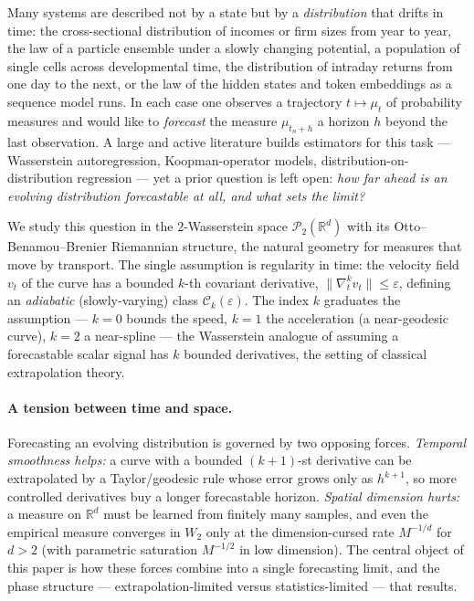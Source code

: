 \documentclass[11pt]{article}
\theoremstyle{definition}
\theoremstyle{remark}
\newcommand{\R}{\mathbb{R}}
\newcommand{\PP}{\mathcal{P}_2(\R^d)}
\newcommand{\Ck}{\mathcal{C}_k(\varepsilon)}
\begin{document}
Many systems are described not by a state but by a \emph{distribution} that drifts in time: the
cross-sectional distribution of incomes or firm sizes from year to year, the law of a particle
ensemble under a slowly changing potential, a population of single cells across developmental
time, the distribution of intraday returns from one day to the next, or the law of the hidden
states and token embeddings as a sequence model runs. In each case one observes a trajectory
$t\mapsto\mu_t$ of probability measures and would like to \emph{forecast} the measure
$\mu_{t_n+h}$ a horizon $h$ beyond the last observation. A large and active literature builds
estimators for this task --- Wasserstein autoregression, Koopman-operator models,
distribution-on-distribution regression --- yet a prior question is left open: \emph{how far
ahead is an evolving distribution forecastable at all, and what sets the limit?}

We study this question in the $2$-Wasserstein space $\PP$ with its Otto--Benamou--Brenier
Riemannian structure, the natural geometry for measures that move by transport. The single
assumption is regularity in time: the velocity field $v_t$ of the curve has a bounded $k$-th
covariant derivative, $\|\nabla_t^k v_t\|\le\varepsilon$, defining an \emph{adiabatic}
(slowly-varying) class $\Ck$. The index $k$ graduates the assumption --- $k=0$ bounds the speed,
$k=1$ the acceleration (a near-geodesic curve), $k=2$ a near-spline --- the Wasserstein analogue
of assuming a forecastable scalar signal has $k$ bounded derivatives, the setting of classical
extrapolation theory.

\paragraph{A tension between time and space.} Forecasting an evolving distribution is governed by
two opposing forces. \emph{Temporal smoothness helps:} a curve with a bounded $(k{+}1)$-st
derivative can be extrapolated by a Taylor/geodesic rule whose error grows only as $h^{k+1}$, so
more controlled derivatives buy a longer forecastable horizon. \emph{Spatial dimension hurts:} a
measure on $\R^d$ must be learned from finitely many samples, and even the empirical measure
converges in $W_2$ only at the dimension-cursed rate $M^{-1/d}$ for $d>2$ (with parametric saturation $M^{-1/2}$ in low dimension). The central object of this paper
is how these forces combine into a single forecasting limit, and the phase structure ---
extrapolation-limited versus statistics-limited --- that results.
\end{document}
